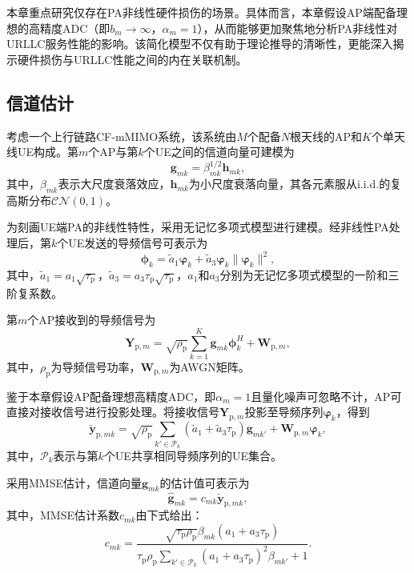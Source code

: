 本章重点研究仅存在PA非线性硬件损伤的场景。具体而言，本章假设AP端配备理想的高精度ADC（即$b_m \to \infty$，$\alpha_m = 1$），从而能够更加聚焦地分析PA非线性对URLLC服务性能的影响。该简化模型不仅有助于理论推导的清晰性，更能深入揭示硬件损伤与URLLC性能之间的内在关联机制。

\subsection{信道估计}

考虑一个上行链路CF-mMIMO系统，该系统由$M$个配备$N$根天线的AP和$K$个单天线UE构成。第$m$个AP与第$k$个UE之间的信道向量可建模为
\begin{equation}
\mathbf{g}_{mk} = \beta_{mk}^{1/2} \mathbf{h}_{mk},
\end{equation}
其中，$\beta_{mk}$表示大尺度衰落效应，$\mathbf{h}_{mk}$为小尺度衰落向量，其各元素服从i.i.d.的复高斯分布$\mathcal{CN}(0,1)$。

为刻画UE端PA的非线性特性，采用无记忆多项式模型进行建模。经非线性PA处理后，第$k$个UE发送的导频信号可表示为
\begin{equation}
\boldsymbol{\phi}_k = \tilde{a}_1\boldsymbol{\varphi}_k + \tilde{a}_3\boldsymbol{\varphi}_k\|\boldsymbol{\varphi}_k\|^2,
\end{equation}
其中，$\tilde{a}_1 = a_1\sqrt{\tau_\text{p}}$，$\tilde{a}_3 = a_3\tau_\text{p}\sqrt{\tau_\text{p}}$，$a_1$和$a_3$分别为无记忆多项式模型的一阶和三阶复系数。

第$m$个AP接收到的导频信号为
\begin{equation}
\mathbf{Y}_{\text{p},m} = \sqrt{\rho_\text{p}}\sum_{k=1}^{K}\mathbf{g}_{mk}\boldsymbol{\phi}_k^H + \mathbf{W}_{\text{p},m},
\end{equation}
其中，$\rho_\text{p}$为导频信号功率，$\mathbf{W}_{\text{p},m}$为AWGN矩阵。

鉴于本章假设AP配备理想高精度ADC，即$\alpha_m = 1$且量化噪声可忽略不计，AP可直接对接收信号进行投影处理。将接收信号$\mathbf{Y}_{\text{p},m}$投影至导频序列$\boldsymbol{\varphi}_k$，得到
\begin{equation}
\check{\mathbf{y}}_{\text{p},mk} = \sqrt{\rho_\text{p}}\sum_{k'\in\mathcal{P}_k}(\tilde{a}_1+\tilde{a}_3\tau_\text{p})\mathbf{g}_{mk'} + \mathbf{W}_{\text{p},m}\boldsymbol{\varphi}_k,
\end{equation}
其中，$\mathcal{P}_k$表示与第$k$个UE共享相同导频序列的UE集合。

采用MMSE估计，信道向量$\mathbf{g}_{mk}$的估计值可表示为
\begin{equation}
\hat{\mathbf{g}}_{mk} = c_{mk}\check{\mathbf{y}}_{\text{p},mk},
\end{equation}
其中，MMSE估计系数$c_{mk}$由下式给出：
\begin{equation}
c_{mk} = \frac{\sqrt{\tau_\text{p}\rho_\text{p}}\beta_{mk}(a_1+a_3\tau_\text{p})}{\tau_\text{p}\rho_\text{p}\sum_{k'\in\mathcal{P}_k}(a_1+a_3\tau_\text{p})^2\beta_{mk'}+1}.
\end{equation}

